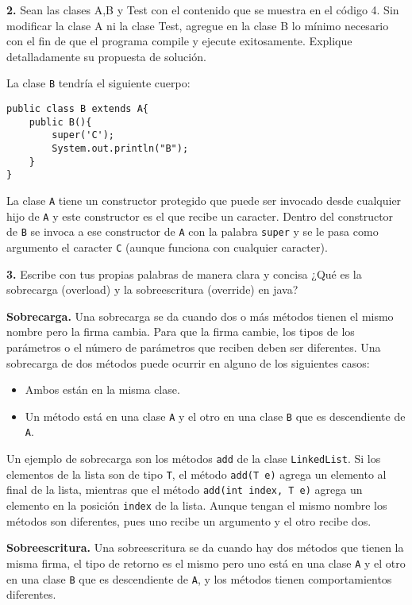 \documentclass{article}
\begin{document}
\textbf{2.} Sean las clases A,B y Test con el contenido que se muestra en el código 4. Sin modificar la clase A ni la clase Test, agregue en la clase B lo mínimo necesario con el fin de que el programa compile y ejecute exitosamente. Explique detalladamente su propuesta de solución.

La clase \texttt{B} tendría el siguiente cuerpo:

\begin{verbatim}
public class B extends A{
    public B(){
        super('C');
        System.out.println("B");
    }
}
\end{verbatim}

La clase \texttt{A} tiene un constructor protegido que puede ser invocado desde cualquier hijo de \texttt{A} y este constructor es el que recibe un caracter. Dentro del constructor de \texttt{B} se invoca a ese constructor de \texttt{A} con la palabra \texttt{super} y se le pasa como argumento el caracter \texttt{C} (aunque funciona con cualquier caracter).

\vspace{5mm}

\textbf{3.} Escribe con tus propias palabras de manera clara y concisa ¿Qué es la sobrecarga (overload) y la sobreescritura (override) en java?

\textbf{Sobrecarga.} Una sobrecarga se da cuando dos o más métodos tienen el mismo nombre pero la firma cambia. Para que la firma cambie, los tipos de los parámetros o el número de parámetros que reciben deben ser diferentes. Una sobrecarga de dos métodos puede ocurrir en alguno de los siguientes casos:

\begin{itemize}
\item Ambos están en la misma clase.
\item Un método está en una clase \texttt{A} y el otro en una clase \texttt{B} que es descendiente de \texttt{A}.
\end{itemize}

Un ejemplo de sobrecarga son los métodos \texttt{add} de la clase \texttt{LinkedList}. Si los elementos de la lista son de tipo \texttt{T}, el método \texttt{add(T e)} agrega un elemento al final de la lista, mientras que el método \texttt{add(int index, T e)} agrega un elemento en la posición \texttt{index} de la lista. Aunque tengan el mismo nombre los métodos son diferentes, pues uno recibe un argumento y el otro recibe dos.

\textbf{Sobreescritura.} Una sobreescritura se da cuando hay dos métodos que tienen la misma firma, el tipo de retorno es el mismo pero uno está en una clase \texttt{A} y el otro en una clase \texttt{B} que es descendiente de \texttt{A}, y los métodos tienen comportamientos diferentes.
\end{document}
